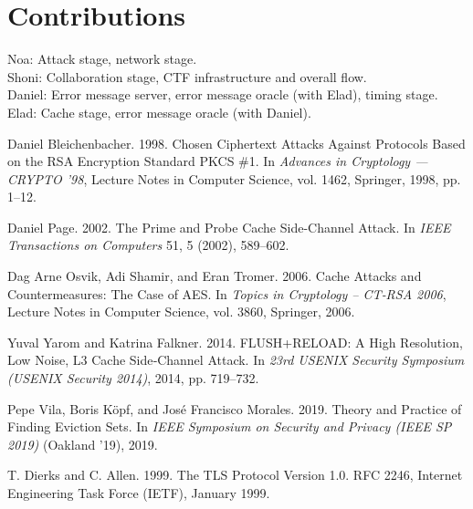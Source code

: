 \documentclass[sigconf]{acmart}
\begin{document}
\section{Contributions}
Noa: Attack stage, network stage. \\
Shoni: Collaboration stage, CTF infrastructure and overall flow. \\
Daniel: Error message server, error message oracle (with Elad), timing stage. \\
Elad: Cache stage, error message oracle (with Daniel).


\begin{thebibliography}{9}

Daniel Bleichenbacher. 1998.
Chosen Ciphertext Attacks Against Protocols Based on the RSA Encryption Standard PKCS \#1.
In \emph{Advances in Cryptology — CRYPTO '98}, Lecture Notes in Computer Science, vol. 1462, Springer, 1998, pp. 1--12.

Daniel Page. 2002.
The Prime and Probe Cache Side-Channel Attack.
In \emph{IEEE Transactions on Computers} 51, 5 (2002), 589–602.


Dag Arne Osvik, Adi Shamir, and Eran Tromer. 2006.
Cache Attacks and Countermeasures: The Case of AES.
In \emph{Topics in Cryptology – CT‑RSA 2006}, Lecture Notes in Computer Science, vol. 3860, Springer, 2006.

Yuval Yarom and Katrina Falkner. 2014.
FLUSH+RELOAD: A High Resolution, Low Noise, L3 Cache Side‑Channel Attack.
In \emph{23rd USENIX Security Symposium (USENIX Security 2014)}, 2014, pp. 719--732.

Pepe Vila, Boris Köpf, and José Francisco Morales. 2019.
Theory and Practice of Finding Eviction Sets.
In \emph{IEEE Symposium on Security and Privacy (IEEE SP 2019)} (Oakland '19), 2019.

T. Dierks and C. Allen. 1999.
The TLS Protocol Version 1.0.
RFC 2246, Internet Engineering Task Force (IETF), January 1999.

\end{thebibliography}
\end{document}
